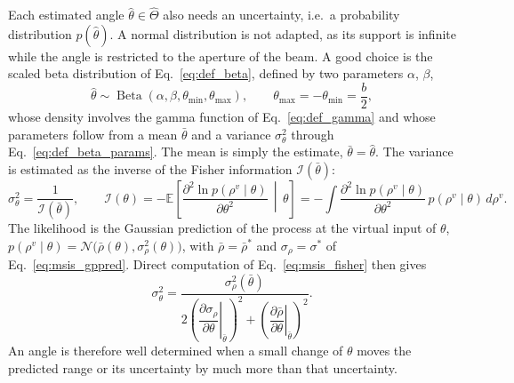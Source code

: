 Each estimated angle $\hat{\theta} \in \hat{\Theta}$ also needs an uncertainty, i.e.\ a probability
distribution $p(\hat{\theta})$. A normal distribution is not adapted, as its support is infinite while
the angle is restricted to the aperture of the beam. A good choice is the scaled beta distribution
\citep{johnson1994continuous} of Eq.~\eqref{eq:def_beta}, defined by two parameters $\alpha$, $\beta$,
\begin{equation}                         %
  \hat{\theta} \sim \operatorname{Beta}(\alpha, \beta, \theta_{\min}, \theta_{\max}), \qquad
  \theta_{\max} = -\theta_{\min} = \frac{b}{2},
  \label{eq:msis_beta}
\end{equation}
whose density involves the gamma function of Eq.~\eqref{eq:def_gamma} and whose parameters follow
from a mean $\bar{\theta}$ and a variance $\sigma_\theta^2$ through Eq.~\eqref{eq:def_beta_params}. The
mean is simply the estimate, $\bar{\theta} = \hat{\theta}$. The variance is estimated as the inverse of
the Fisher information $\mathcal{I}(\bar{\theta})$:
\begin{equation}                         %
  \sigma_\theta^2 = \frac{1}{\mathcal{I}(\bar{\theta})}, \qquad
  \mathcal{I}(\theta) = -\mathbb{E}\!\left[\frac{\partial^2 \ln p(\rho^v \mid \theta)}{\partial\theta^2} \,\middle|\, \theta\right]
  = -\int \frac{\partial^2 \ln p(\rho^v \mid \theta)}{\partial\theta^2}\, p(\rho^v \mid \theta)\, d\rho^v.
  \label{eq:msis_fisher}
\end{equation}
The likelihood is the Gaussian prediction of the process at the virtual input of $\theta$,
$p(\rho^v \mid \theta) = \mathcal{N}\big(\bar{\rho}(\theta), \sigma_\rho^2(\theta)\big)$, with
$\bar{\rho} = \bar{\rho}^{*}$ and $\sigma_\rho = \sigma^{*}$ of Eq.~\eqref{eq:msis_gppred}. Direct
computation of Eq.~\eqref{eq:msis_fisher} then gives
\begin{equation}                         %
  \sigma_\theta^2 = \frac{\sigma_\rho^2(\bar{\theta})}
  {2\left(\left.\dfrac{\partial\sigma_\rho}{\partial\theta}\right|_{\bar{\theta}}\right)^2
   + \left(\left.\dfrac{\partial\bar{\rho}}{\partial\theta}\right|_{\bar{\theta}}\right)^2}.
  \label{eq:msis_sigmatheta}
\end{equation}
An angle is therefore well determined when a small change of $\theta$ moves the predicted range or
its uncertainty by much more than that uncertainty.

